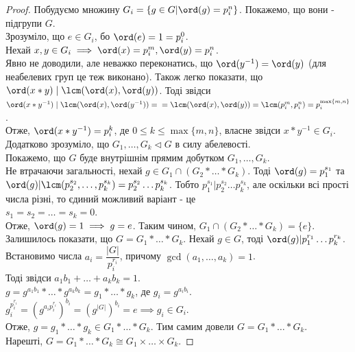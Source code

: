 \documentclass{math_library}
\begin{document}
\begin{proof}
Побудуємо множину $G_i = \{g \in G | \ord(g) = p_i^n\}$. Покажемо, що вони - підгрупи $G$.\\
Зрозуміло, що $e \in G_i$, бо $\ord(e) = 1 = p_i^0$.\\
Нехай $x,y \in G_i \implies \ord(x) = p_i^{m}, \ord(y) = p_i^n$.\\
Явно не доводили, але неважко переконатись, що $\ord(y^{-1}) = \ord(y)$ (для неабелевих груп це теж виконано). Також легко показати, що \\
$\ord(x*y) \mid \lcm(\ord(x), \ord(y))$. Тоді звідси\\
$\ord(x*y^{-1}) \mid \lcm(\ord(x), \ord(y^{-1})) = \\ =\lcm(\ord(x),\ord(y)) = \lcm(p_i^m,p_i^n) = p_i^{\max\{m,n\}}$.\\
Отже, $\ord(x*y^{-1}) = p_i^{k}$, де $0 \leq k \leq \max\{m,n\}$, власне звідси $x*y^{-1} \in G_i$.\\
Додатково зрозуміло, що $G_1,\dots,G_k \triangleleft G$ в силу абелевості.
\bigskip \\
Покажемо, що $G$ буде внутрішнім прямим добутком $G_1,\dots,G_k$.\\
Не втрачаючи загальності, нехай $g \in G_1 \cap (G_2*\dots*G_k)$. Тоді $\ord(g) = p_1^{s_1}$ та $\ord(g) | \lcm(p_2^{s_2},\dots,p_k^{s_k}) = p_2^{s_2} \dots p_k^{s_k}$. Тобто $p_1^{s_1} | p_2^{s_2} \dots p_k^{s_k}$, але оскільки всі прості числа різні, то єдиний можливий варіант - це \\
$s_1 = s_2 = \dots = s_k = 0$.\\
Отже, $\ord(g) = 1 \implies g = e$. Таким чином, $G_1 \cap (G_2*\dots*G_k) = \{e\}$.\\
Залишилось показати, що $G = G_1 * \dots * G_k$. Нехай $g \in G$, тоді $\ord(g) | p_1^{r_1} \dots p_k^{r_k}$.\\
Встановимо числа $a_i = \dfrac{|G|}{p_i^{r_i}}$, причому $\gcd(a_1,\dots,a_k) = 1$.\\
Тоді звідси $a_1b_1 + \dots + a_kb_k = 1$.\\
$g = g^{a_1b_1} * \dots * g^{a_kb_k} = g_1 * \dots * g_k$, де $g_i = g^{a_ib_i}$.\\
$g_i^{p_i^{r_i}} = (g^{a_ip_i^{r_i}})^{b_i} = (g^{|G|})^{b_i} = e \implies g_i \in G_i$.\\
Отже, $g = g_1*\dots*g_k \in G_1*\dots*G_k$. Тим самим довели $G = G_1*\dots*G_k$.\\
Нарешті, $G = G_1*\dots*G_k \cong G_1 \times \dots \times G_k$.
\end{proof}
\end{document}
